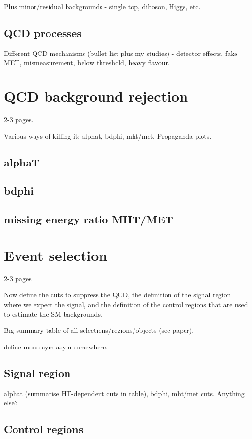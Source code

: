 Plus minor/residual backgrounds - single top, diboson, Higgs, etc.
	
\subsection{QCD processes}

Different QCD mechanisms (bullet list plus my studies) - detector effects, fake 
MET, mismeasurement, below threshold, heavy flavour.

\section{QCD background rejection}
2-3 pages.

Various ways of killing it: alphat, bdphi, mht/met.
Propaganda plots.

\subsection{alphaT}

\subsection{bdphi}

\subsection{missing energy ratio MHT/MET}

\section{Event selection}
2-3 pages

Now define the cuts to suppress the QCD, the definition of the signal region 
where we expect the signal, and the definition of the control regions that are 
used to estimate the SM backgrounds.

Big summary table of all selections/regions/objects (see paper).

define mono sym asym somewhere.

\subsection{Signal region}

alphat (summarise HT-dependent cuts in table), bdphi, mht/met cuts.
Anything else?

\subsection{Control regions}

